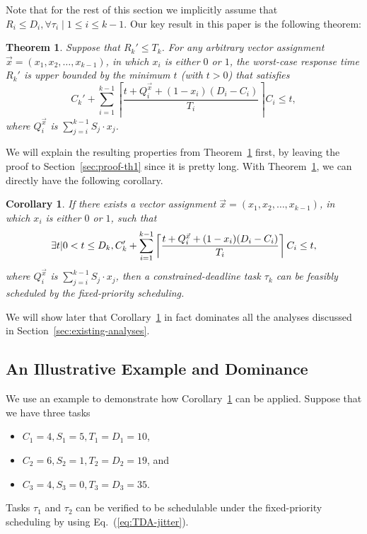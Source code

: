 \documentclass[10pt,conference,preprint]{IEEEtran}
\newcommand{\ceiling}[1]{\left\lceil{#1}\right\rceil}
\newtheorem{theorem}{Theorem}
\newtheorem{Corollary}{Corollary}
\begin{document}
Note that for the rest of this section we implicitly assume that $R_i
\leq D_i, \forall \tau_i \mid 1 \leq i \leq k-1$.  Our key result in
this paper is the following theorem:

\begin{theorem}
   \label{theorem:general-framework}
   Suppose that $R_k' \leq T_k$.
   For any arbitrary vector assignment $\vec{x} = (x_1, x_2, \ldots,
   x_{k-1})$, in which $x_i$ is either $0$ or $1$, the worst-case
   response time $R_k'$ is upper bounded by the minimum $t$ (with $t > 0$) that
   satisfies 
   {\small \begin{equation} \label{eq:TDA-suspension-tighter0} 
       C_k'+ \sum_{i=1}^{k-1}\ceiling{\frac{t+Q_i^{\vec{x}}+(1-x_i)(D_i-C_i)}{T_i}} C_i \leq t,
     \end{equation}}where $Q_i^{\vec{x}}$ is $\sum_{j=i}^{k-1} S_j \cdot x_j$.
 \end{theorem} 
 We will explain the resulting properties from
 Theorem~\ref{theorem:general-framework} first, by leaving the proof
 to Section~\ref{sec:proof-th1} since it is pretty long.  With
 Theorem~\ref{theorem:general-framework}, we can directly have the
 following corollary.

 \begin{Corollary}
   \label{corollary:general-framework}
   If there exists a vector assignment $\vec{x} = (x_1, x_2, \ldots,
   x_{k-1})$, in which $x_i$ is either $0$ or $1$, such that 
   {\small \begin{equation} \label{eq:TDA-suspension-tighter} 
       \exists t | 0 < t \leq D_k, \\
       C_k'+ \sum_{i=1}^{k-1}\ceiling{\frac{t+Q_i^{\vec{x}}+(1-x_i)(D_i-C_i)}{T_i}} C_i \leq t,
     \end{equation}}where $Q_i^{\vec{x}}$ is $\sum_{j=i}^{k-1} S_j \cdot x_j$, then a constrained-deadline task $\tau_k$ can be feasibly scheduled by the fixed-priority scheduling.
 \end{Corollary}
 We will show later that Corollary~\ref{corollary:general-framework} in fact
 dominates all the analyses discussed in Section~\ref{sec:existing-analyses}.

\subsection{An Illustrative Example and Dominance}

We use an example to demonstrate how
Corollary~\ref{corollary:general-framework} can be applied. Suppose
that we have three tasks
\begin{itemize}
\item $C_1 = 4, S_1 = 5, T_1=D_1=10$, 
\item $C_2 = 6, S_2 = 1, T_2=D_2=19$,  and
\item $C_3 = 4, S_3 = 0, T_3=D_3=35$.
\end{itemize}
Tasks $\tau_1$ and $\tau_2$ can be verified to be schedulable under
the fixed-priority scheduling by using Eq.~(\ref{eq:TDA-jitter}). 
\end{document}
